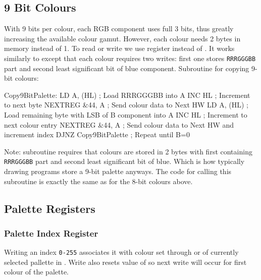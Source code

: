 \subsection{9 Bit Colours}

With 9 bits per colour, each RGB component uses full 3 bits, thus greatly increasing the available colour gamut. However, each colour needs 2 bytes in memory instead of 1. To read or write we use  register instead of . It works similarly to  except that each colour requires two writes: first one stores {\tt RRRGGGBB} part and second least significant bit of blue component. Subroutine for copying 9-bit colours:

\begin{tcblisting}{}
Copy9BitPalette:
	LD A, (HL)                ; Load RRRGGGBB into A
	INC HL                    ; Increment to next byte
	NEXTREG &44, A            ; Send colour data to Next HW
	LD A, (HL)                ; Load remaining byte with LSB of B component into A
	INC HL                    ; Increment to next colour entry
	NEXTREG &44, A            ; Send colour data to Next HW and increment index
	DJNZ Copy9BitPalette      ; Repeat until B=0
\end{tcblisting}

Note: subroutine requires that colours are stored in 2 bytes with first containing {\tt RRRGGGBB} part and second least significant bit of blue. Which is how typically drawing programs store a 9-bit palette anyways. The code for calling this subroutine is exactly the same as for the 8-bit colours above.


\subsection{Palette Registers}
\label{zx_next_palette_registers}

\subsubsection{Palette Index Register }

\begin{NextPort}
\end{NextPort}

Writing an index {\tt 0-255} associates it with colour set through  or  of currently selected pallette in . Write also resets value of  so next write will occur for first colour of the palette.

